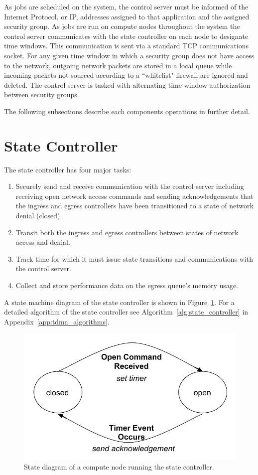 \documentclass[oneside,12pt]{memoir}
\begin{document}
As jobs are scheduled on the system, the control server must be informed of the Internet Protocol, or IP, addresses assigned to that application and the assigned security group. As jobs are run on compute nodes throughout the system the control server communicates with the state controller on each node to designate time windows. This communication is sent via a standard TCP communications socket. For any given time window in which a security group does not have access to the network, outgoing network packets are stored in a local queue while incoming packets not sourced according to a ``whitelist" firewall are ignored and deleted. The control server is tasked with alternating time window authorization between security groups.

The following subsections describe each components operations in further detail. 
\section{State Controller}
The state controller has four major tasks:
\begin{enumerate} \itemsep1pt \parskip0pt 
\item Securely send and receive communication with the control server including receiving open network access commands and sending acknowledgements that the ingress and egress controllers have been transitioned to a state of network denial (closed).
\item Transit both the ingress and egress controllers between states of network access and denial.
\item Track time for which it must issue state transitions and communications with the control server.
\item Collect and store performance data on the egress queue's memory usage.
\end{enumerate}

A state machine diagram of the state controller is shown in Figure~\ref{fig:node_state_diagram}. For a detailed algorithm of the state controller see Algorithm~\ref{alg:state_controller} in Appendix~\ref{app:tdma_algorithms}.

\begin{figure}
\centering
\includegraphics[scale=0.7]{node_state_diagram.pdf}
\caption{State diagram of a compute node running the state controller.}
\label{fig:node_state_diagram}
\end{figure}
\end{document}
